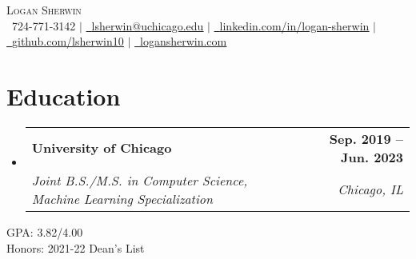 \documentclass[letterpaper,11pt]{article}
\makeatletter
\newcommand{\resumeSubheading}[4]{
  \vspace{-2pt}\item
    \begin{tabular*}{1.0\textwidth}[t]{l@{\extracolsep{\fill}}r}
      \textbf{#1} & \textbf{\small #2} \\
      \textit{\small#3} & \textit{\small #4} \\
    \end{tabular*}\vspace{-7pt}
}
\newcommand{\resumeSubHeadingListStart}{\begin{itemize}[leftmargin=0.0in, label={}]}
\newcommand{\resumeSubHeadingListEnd}{\end{itemize}}
\makeatother
\begin{document}

\begin{center}
    {\Huge \scshape Logan Sherwin} \\ \vspace{1pt}
    \small \raisebox{-0.1\height}\ 724-771-3142 $|$ \href{mailto:lsherwin@uchicago.edu}{\raisebox{-0.2\height}\  \underline{lsherwin@uchicago.edu}} $|$ 
    \href{https://linkedin.com/in/logan-sherwin/}{\raisebox{-0.2\height}\ \underline{linkedin.com/in/logan-sherwin}}  $|$
    \href{https://github.com/lsherwin10}{\raisebox{-0.2\height}\ \underline{github.com/lsherwin10}} $|$ \href{https://logansherwin.com/}{\raisebox{-0.2\height}\ \underline{logansherwin.com}}
    \vspace{-8pt}
\end{center}


\section{Education}
  \resumeSubHeadingListStart
    \resumeSubheading
      {University of Chicago}{Sep. 2019 -- Jun. 2023}
      {Joint B.S./M.S. in Computer Science, Machine Learning Specialization}{Chicago, IL}
  \resumeSubHeadingListEnd
  \vspace{-6pt} \small GPA: 3.82/4.00 \\
  \vspace{-1pt} \small Honors: 2021-22 Dean's List \vspace{-8pt}

\end{document}
